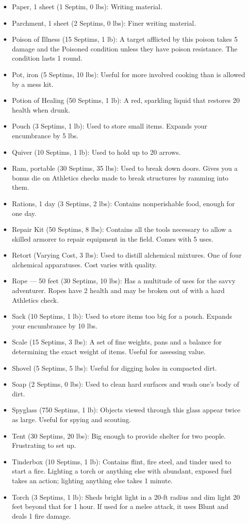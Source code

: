 \documentclass[12pt]{book}
\begin{document}
\begin{itemize}
	\item Paper, 1 sheet (1 Septim, 0 lbs): Writing material.
	\item Parchment, 1 sheet (2 Septims, 0 lbs): Finer writing material.
	\item Poison of Illness (15 Septims, 1 lb): A target afflicted by this poison takes 5 damage and the Poisoned condition unless they have poison resistance. The condition lasts 1 round.
	\item Pot, iron (5 Septims, 10 lbs): Useful for more involved cooking than is allowed by a mess kit.
	\item Potion of Healing (50 Septims, 1 lb): A red, sparkling liquid that restores 20 health when drunk.
	\item Pouch (3 Septims, 1 lb): Used to store small items. Expands your encumbrance by 5 lbs.
	\item Quiver (10 Septims, 1 lb): Used to hold up to 20 arrows.
	\item Ram, portable (30 Septims, 35 lbs): Used to break down doors. Gives you a bonus die on Athletics checks made to break structures by ramming into them.
	\item Rations, 1 day (3 Septims, 2 lbs): Contains nonperishable food, enough for one day.
	\item Repair Kit (50 Septims, 8 lbs): Contains all the tools necessary to allow a skilled armorer to repair equipment in the field. Comes with 5 uses.
	\item Retort (Varying Cost, 3 lbs): Used to distill alchemical mixtures. One of four alchemical apparatuses. Cost varies with quality.
	\item Rope --- 50 feet (30 Septims, 10 lbs): Has a multitude of uses for the savvy adventurer. Ropes have 2 health and may be broken out of with a hard Athletics check.
	\item Sack (10 Septims, 1 lb): Used to store items too big for a pouch. Expands your encumbrance by 10 lbs.
	\item Scale (15 Septims, 3 lbs): A set of fine weights, pans and a balance for determining the exact weight of items. Useful for assessing value.
	\item Shovel (5 Septims, 5 lbs): Useful for digging holes in compacted dirt.
	\item Soap (2 Septims, 0 lbs): Used to clean hard surfaces and wash one's body of dirt.
	\item Spyglass (750 Septims, 1 lb): Objects viewed through this glass appear twice as large. Useful for spying and scouting.
	\item Tent (30 Septims, 20 lbs): Big enough to provide shelter for two people. Frustrating to set up.
	\item Tinderbox (10 Septims, 1 lb): Contains flint, fire steel, and tinder used to start a fire. Lighting a torch or anything else with abundant, exposed fuel takes an action; lighting anything else takes 1 minute.
	\item Torch (3 Septims, 1 lb): Sheds bright light in a 20-ft radius and dim light 20 feet beyond that for 1 hour. If used for a melee attack, it uses Blunt and deals 1 fire damage.
\end{itemize}
\end{document}
